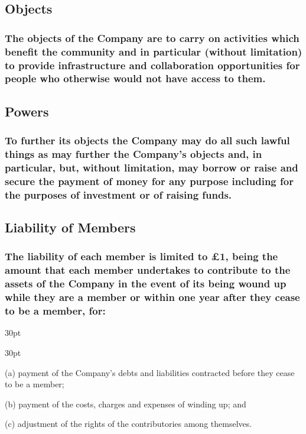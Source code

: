 \documentclass[12pt]{article}
\def\clauseindent{30pt}
\newenvironment{subindentlist}{\raggedright\begin{adjustwidth}{\clauseindent}{}\begin{labeledlist}{\clauseindent}}{\end{labeledlist}\end{adjustwidth}}
\begin{document}
\subsection{Objects}
\subsubsection[Broad objective of the Company and Hackerspace]{The objects of the Company are to carry on activities which benefit the community and in particular (without limitation) to provide infrastructure and collaboration opportunities for people who otherwise would not have access to them.}

\subsection{Powers}
\subsubsection[Broad powers of the Company and Hackerspace]{To further its objects the Company may do all such lawful things as may further the Company's objects and, in particular, but, without limitation, may borrow or raise and secure the payment of money for any purpose including for the purposes of investment or of raising funds.}

\subsection{Liability of Members}
\subsubsection[Liability of Members is \pounds{1}]{The liability of each member is limited to \pounds{1}, being the amount that each member undertakes to contribute to the assets of the Company in the event of its being wound up while they are a member or within one year after they cease to be a member, for:}
\begin{subindentlist}
  \item [(a)] payment of the Company's debts and liabilities contracted before they cease to be a member;
  \item [(b)] payment of the costs, charges and expenses of winding up; and
  \item [(c)] adjustment of the rights of the contributories among themselves.
\end{subindentlist}
\end{document}
